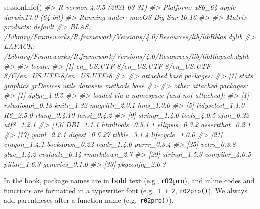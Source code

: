 \documentclass[
]{book}
\newenvironment{Shaded}{\begin{snugshade}}{\end{snugshade}}
\newcommand{\CommentTok}[1]{\textcolor[rgb]{0.56,0.35,0.01}{\textit{#1}}}
\newcommand{\FunctionTok}[1]{\textcolor[rgb]{0.00,0.00,0.00}{#1}}
\newcommand{\NormalTok}[1]{#1}
\begin{document}
\begin{Shaded}
\begin{Highlighting}[]
\FunctionTok{sessionInfo}\NormalTok{()}
\CommentTok{\#\textgreater{} R version 4.0.5 (2021{-}03{-}31)}
\CommentTok{\#\textgreater{} Platform: x86\_64{-}apple{-}darwin17.0 (64{-}bit)}
\CommentTok{\#\textgreater{} Running under: macOS Big Sur 10.16}
\CommentTok{\#\textgreater{} }
\CommentTok{\#\textgreater{} Matrix products: default}
\CommentTok{\#\textgreater{} BLAS:   /Library/Frameworks/R.framework/Versions/4.0/Resources/lib/libRblas.dylib}
\CommentTok{\#\textgreater{} LAPACK: /Library/Frameworks/R.framework/Versions/4.0/Resources/lib/libRlapack.dylib}
\CommentTok{\#\textgreater{} }
\CommentTok{\#\textgreater{} locale:}
\CommentTok{\#\textgreater{} [1] en\_US.UTF{-}8/en\_US.UTF{-}8/en\_US.UTF{-}8/C/en\_US.UTF{-}8/en\_US.UTF{-}8}
\CommentTok{\#\textgreater{} }
\CommentTok{\#\textgreater{} attached base packages:}
\CommentTok{\#\textgreater{} [1] stats     graphics  grDevices utils     datasets  methods   base     }
\CommentTok{\#\textgreater{} }
\CommentTok{\#\textgreater{} other attached packages:}
\CommentTok{\#\textgreater{} [1] dplyr\_1.0.5}
\CommentTok{\#\textgreater{} }
\CommentTok{\#\textgreater{} loaded via a namespace (and not attached):}
\CommentTok{\#\textgreater{}  [1] rstudioapi\_0.13   knitr\_1.32        magrittr\_2.0.1    hms\_1.0.0        }
\CommentTok{\#\textgreater{}  [5] tidyselect\_1.1.0  R6\_2.5.0          rlang\_0.4.10      fansi\_0.4.2      }
\CommentTok{\#\textgreater{}  [9] stringr\_1.4.0     tools\_4.0.5       xfun\_0.22         utf8\_1.2.1       }
\CommentTok{\#\textgreater{} [13] DBI\_1.1.1         htmltools\_0.5.1.1 ellipsis\_0.3.2    assertthat\_0.2.1 }
\CommentTok{\#\textgreater{} [17] yaml\_2.2.1        digest\_0.6.27     tibble\_3.1.4      lifecycle\_1.0.0  }
\CommentTok{\#\textgreater{} [21] crayon\_1.4.1      bookdown\_0.22     readr\_1.4.0       purrr\_0.3.4      }
\CommentTok{\#\textgreater{} [25] vctrs\_0.3.8       glue\_1.4.2        evaluate\_0.14     rmarkdown\_2.7    }
\CommentTok{\#\textgreater{} [29] stringi\_1.5.3     compiler\_4.0.5    pillar\_1.6.3      generics\_0.1.0   }
\CommentTok{\#\textgreater{} [33] pkgconfig\_2.0.3}
\end{Highlighting}
\end{Shaded}

In the book, package names are in \textbf{bold} text (e.g., \textbf{r02pro}), and inline codes and functions are formatted in a typewriter font (e.g.~\texttt{1\ +\ 2}, \texttt{r02pro()}). We always add parentheses after a function name (e.g.~\texttt{r02pro()}).
\end{document}
